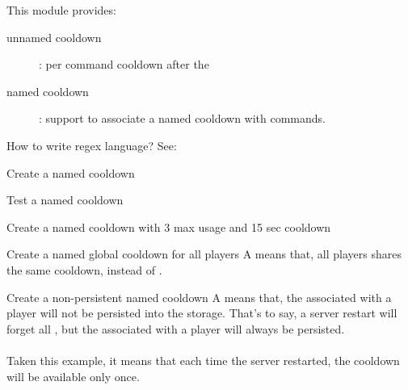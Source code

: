 \label{ch:command_cooldown}

This module provides:

\begin{description}
    \item [unnamed cooldown]: {per command cooldown after the }
    \item [named cooldown]: {support to associate a named cooldown with commands.}
\end{description}

\begin{tips}{How to write regex language?}
    See:~
\end{tips}


\begin{example}{Create a named cooldown}
\end{example}

\begin{example}{Test a named cooldown}
\end{example}

\begin{example}{Create a named cooldown with 3 max usage and 15 sec cooldown}
\end{example}

\begin{example}{Create a named global cooldown for all players}
    A  means that, all players shares the same cooldown, instead of .\\
\end{example}

\begin{example}{Create a non-persistent named cooldown}
    A  means that, the  associated with a player will not be persisted into the storage.
    That's to say, a server restart will forget all , but the  associated with a player will always be persisted.\\
    \\
    Taken this example, it means that each time the server restarted, the cooldown will be available only once.
\end{example}
